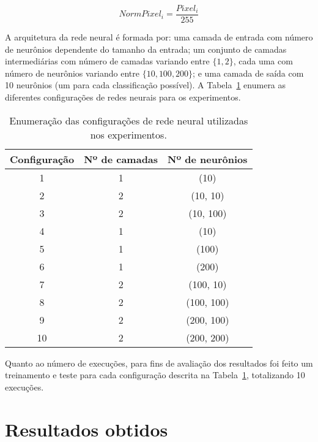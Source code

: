 \documentclass[twocolumn]{article}
\newcommand{\hiddenlayers}{1, 2}
\newcommand{\hiddenneurons}{10, 100, 200}
\begin{document}
    \begin{equation}
        \label{norm-pixel}
        NormPixel_i = \frac{Pixel_i}{255}
    \end{equation}

    A arquitetura da rede neural é formada por: uma camada de entrada com
    número de neurônios dependente do tamanho da entrada; um conjunto de
    camadas intermediárias com número de camadas variando entre
    $\{\hiddenlayers{}\}$, cada uma com número de neurônios variando entre
    $\{\hiddenneurons{}\}$; e uma camada de saída com 10 neurônios (um para
    cada classificação possível). A Tabela~\ref{configs} enumera as diferentes
    configurações de redes neurais para os experimentos.

    \begin{table}[ht]
        \begin{tabular}{c c c}
            \toprule
            Configuração & Nº de camadas & Nº de neurônios \\
            \midrule
            1  & 1 & (10) \\
            2  & 2 & (10, 10) \\
            3  & 2 & (10, 100) \\
            4  & 1 & (10) \\
            5  & 1 & (100) \\
            6  & 1 & (200) \\
            7  & 2 & (100, 10) \\
            8  & 2 & (100, 100) \\
            9  & 2 & (200, 100) \\
            10 & 2 & (200, 200) \\
            \bottomrule
        \end{tabular}
        \caption{%
            Enumeração das configurações de rede neural utilizadas nos
            experimentos.\label{configs}
        }
    \end{table}

    Quanto ao número de execuções, para fins de avaliação dos resultados foi
    feito um treinamento e teste para cada configuração descrita na
    Tabela~\ref{configs}, totalizando 10 execuções.

    \section{Resultados obtidos}
\end{document}
